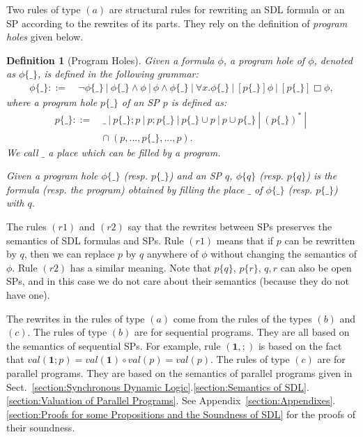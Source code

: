 \documentclass{fcs}
\newtheorem{mydef}{Definition}[section]
\newcommand{\noth}[0]{\mathbf{1}}
\newcommand{\halt}[0]{\mathbf{0}}
\newcommand{\val}[0]{\mathit{val}}
\DeclareMathOperator{\seq}{;}
\DeclareMathOperator{\para}{\cap}
\newcommand{\place}[0]{\_}
\newcommand{\ddef}[0]{::=}
\begin{document}
Two rules of type $(a)$ are structural rules for rewriting an SDL formula or an SP according to the rewrites of its parts.
They rely on the definition of \emph{program holes} given below.
\begin{mydef}[Program Holes]
    Given a formula $\phi$, a program hole of $\phi$, denoted as $\phi\{\place\}$, is defined in the following grammar:
    $$\begin{aligned}
    \phi\{\place\}\ddef&\ \neg \phi\{\place\}\ |\ \phi\{\place\}\wedge \phi\ |\ \phi\wedge \phi\{\place\}\ |\ \forall x.\phi\{\place\}\ |\ [p\{\place\}]\phi\ |\ [p\{\place\}]\Box\phi,
    \end{aligned}
    $$
    where a program hole $p\{\place\}$ of an SP $p$ is defined as:
    $$
    \begin{aligned}
    p\{\place\}\ddef&\ \place\ |\ p\{\place\}\seq p\ |\ p\seq p\{\place\}\ |\ p\{\place\}\cup p\ |\ p\cup p\{\place\}\ |\ (p\{\place\})^*\ |\ \\
    &\para(p,...,p\{\place\},...,p).
    \end{aligned}$$
    We call $\place$ a place which can be filled by a program.

    Given a program hole $\phi\{\place\}$ (resp. $p\{\place\}$) and an SP $q$, $\phi\{q\}$ (resp. $p\{q\}$) is the formula (resp. the program) obtained by filling the place $\place$ of $\phi\{\place\}$ (resp. $p\{\place\}$) with $q$.

\end{mydef}
The rules $(\mathit{r1})$ and $(\mathit{r2})$ say that the rewrites between SPs preserves the semantics of SDL formulas and SPs.
Rule $(\mathit{r1})$ means that if $p$ can be rewritten by $q$, then we can replace $p$ by $q$ anywhere of $\phi$ without changing the semantics of $\phi$.
Rule $(\mathit{r2})$ has a similar meaning.
Note that $p\{q\}$, $p\{r\}$, $q, r$ can also be open SPs, and in this case we do not care about their semantics (because they do not have one).

The rewrites in the rules of type $(a)$ come from the rules of the types $(b)$ and $(c)$.
The rules of type $(b)$ are for sequential programs.
They are all based on the semantics of sequential SPs.
For example, rule $(\noth, \seq)$ is based on the fact that $\val(\noth\seq p) = \val(\noth)\circ \val(p) = \val(p)$.
The rules of type $(c)$ are for parallel programs.
They are based on the semantics of parallel programs given in Sect.~\ref{section:Synchronous Dynamic Logic}.\ref{section:Semantics of SDL}.\ref{section:Valuation of Parallel Programs}.
See Appendix~\ref{section:Appendixes}.\ref{section:Proofs for some Propositions and the Soundness of SDL} for the proofs of their soundness.
\end{document}

